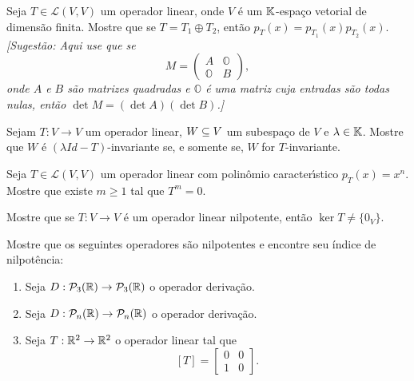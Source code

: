 \documentclass[12pt]{exam}
\begin{document}
\begin{exercicio}
Seja $T \in \mathcal{L}(V,V)$ um operador linear, onde $V$ \'e um $\mathbb{K}$-espa\c{c}o vetorial de dimens\~ao finita. Mostre que se $T = T_1 \oplus T_2$, ent\~ao $p_T(x) = p_{T_1}(x)p_{T_2}(x)$.
\textit{[Sugest\~ao: Aqui use que se
\[
  M = \begin{pmatrix}
    A & \mathbb{O}\\
    \mathbb{O} & B
  \end{pmatrix},
\]
onde $A$ e $B$ s\~ao matrizes quadradas e $\mathbb{O}$ \'e uma matriz cuja entradas s\~ao todas nulas, ent\~ao $\det M = (\det A)(\det B)$.]}
\end{exercicio}

\begin{exercicio}
  Sejam $T : V \to V$ um operador linear, $W \subseteq V$ um subespa\c{c}o de $V$ e $\lambda \in \mathbb{K}$. Mostre que $W$ \'e $(\lambda Id - T)$-invariante se, e somente se, $W$ for $T$-invariante.
\end{exercicio}

\begin{exercicio}
  Seja $T \in \mathcal{L}(V,V)$ um operador linear com polin\^omio caracter{\'\i}stico $p_T(x) = x^n$. Mostre que existe $m \ge 1$ tal que $T^m = 0$.
\end{exercicio}


\begin{exercicio}
  Mostre que se $T : V \to V$ \'e um operador linear nilpotente, ent\~ao $\ker T \ne \{0_V\}$.
\end{exercicio}

\begin{exercicio}
  Mostre que os seguintes operadores s\~ao nilpotentes e encontre seu \'indice de nilpot\^encia:
  \begin{enumerate}[label=({\alph*})]
    \item Seja $D : \mathcal{P}_3(\mathbb{R}) \to \mathcal{P}_3(\mathbb{R})$ o operador deriva\c{c}\~ao.
    \item Seja $D : \mathcal{P}_n(\mathbb{R}) \to \mathcal{P}_n(\mathbb{R})$ o operador deriva\c{c}\~ao.
    \item Seja $T : \mathbb{R}^2 \to \mathbb{R}^2$ o operador linear tal que
    \[
      [T] = \begin{bmatrix}
        0 & 0\\
        1 & 0
      \end{bmatrix}.
    \]
  \end{enumerate}
\end{exercicio}
\end{document}
